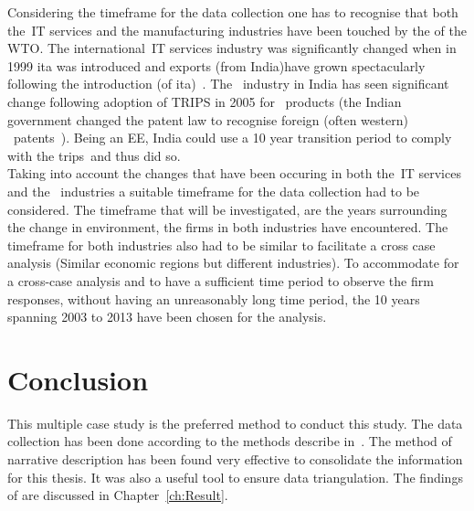 Considering the timeframe for the data collection one has to recognise that
both the~\gls{IT} services and the \pharma manufacturing industries have been touched by the \rr of the WTO\@. 
The international~\gls{IT} services industry was significantly changed when in 1999 \gls{ita} was introduced and exports (from India)have grown spectacularly following the introduction (of \gls{ita})~\cite{LeeMakiyama:2011wz}.
The \pharma~industry in India has seen significant change following adoption of TRIPS in 2005 for \pharma~products (the Indian government changed the patent law to recognise foreign (often western) \pharma~patents~\cite{Chandran:2005vu}).
Being an \glsdesc{EE}, India could use a 10 year transition period to comply with the \gls{trips}~\rr and thus did so.\\
Taking into account the changes that have been occuring in both the~\gls{IT} services and the \pharma~industries a suitable timeframe for the data collection had to be considered. 
The timeframe that will be investigated, are the years surrounding the change in environment, the firms in both industries have encountered.
The timeframe for both industries also had to be similar to facilitate a cross case analysis (Similar economic regions but different industries).
To accommodate for a cross-case analysis and to have a sufficient time period to observe the firm responses, without having an unreasonably long time period, the 10 years spanning 2003 to 2013 have been chosen for the analysis.


\section{Conclusion}%
This multiple case study is the preferred method to conduct this study.
The data collection has been done according to the methods describe in~\citep{Saunders:2009wn,Miles:1994wi,Kolk:2013ks,Maguire:2009bg}.
The method of narrative description has been found very effective to consolidate the information for this thesis.
It was also a useful tool to ensure data triangulation.
The findings of are discussed in Chapter~\ref{ch:Result}.


